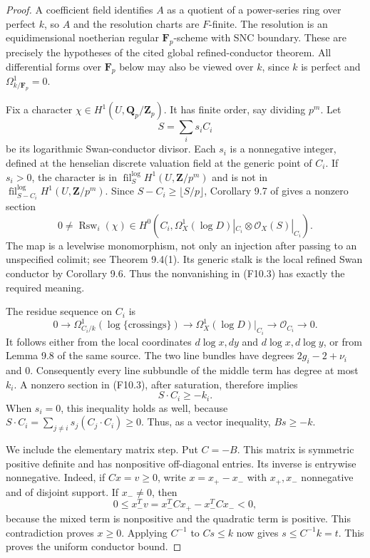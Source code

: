 \begin{proof}
A coefficient field identifies $A$ as a quotient of a power-series
ring over perfect $k$, so $A$ and the resolution charts are
$F$-finite. The resolution is an equidimensional noetherian regular
$\mathbf F_p$-scheme with SNC boundary. These are precisely the
hypotheses of the cited global refined-conductor theorem.
All differential forms over $\mathbf F_p$ below may also be viewed
over $k$, since $k$ is perfect and $\Omega^1_{k/\mathbf F_p}=0$.

Fix a character $\chi\in H^1(U,\mathbf Q_p/\mathbf Z_p)$.
It has finite order, say dividing $p^m$. Let
\[
                         S=\sum_i s_i C_i
\]
be its logarithmic Swan-conductor divisor. Each $s_i$ is a
nonnegative integer, defined at the henselian discrete valuation
field at the generic point of $C_i$. If $s_i>0$, the character is
in $\operatorname{fil}^{\log}_S H^1(U,\mathbf Z/p^m)$ and is not
in $\operatorname{fil}^{\log}_{S-C_i}H^1(U,\mathbf Z/p^m)$.
Since $S-C_i\geq\lfloor S/p\rfloor$, Corollary 9.7 of
\cite{KrishnaMajumder2026} gives a nonzero section
\[
 0\ne\operatorname{Rsw}_i(\chi)\in
 H^0\!\left(C_i,
   \Omega_X^1(\log D)|_{C_i}\otimes\mathcal O_X(S)|_{C_i}\right).
 \tag{F10.3}
\]
The map is a levelwise monomorphism, not only an injection after
passing to an unspecified colimit; see Theorem 9.4(1).
Its generic stalk is the local refined Swan conductor by
Corollary 9.6. Thus the nonvanishing in (F10.3) has exactly the
required meaning.

The residue sequence on $C_i$ is
\[
 0\longrightarrow\Omega^1_{C_i/k}(\log\{\text{crossings}\})
 \longrightarrow\Omega_X^1(\log D)|_{C_i}
 \longrightarrow\mathcal O_{C_i}\longrightarrow0.
 \tag{F10.4}
\]
It follows either from the local coordinates $d\log x,dy$ and
$d\log x,d\log y$, or from Lemma 9.8 of the same source.
The two line bundles have degrees $2g_i-2+\nu_i$ and $0$.
Consequently every line subbundle of the middle term has degree
at most $k_i$. A nonzero section in (F10.3), after saturation,
therefore implies
\[
                              S\cdot C_i\geq-k_i.
 \tag{F10.5}
\]
When $s_i=0$, this inequality holds as well, because
$S\cdot C_i=\sum_{j\ne i}s_j(C_j\cdot C_i)\geq0$.
Thus, as a vector inequality, $Bs\geq-k$.

We include the elementary matrix step. Put $C=-B$. This matrix
is symmetric positive definite and has nonpositive off-diagonal
entries. Its inverse is entrywise nonnegative. Indeed, if
$Cx=v\geq0$, write $x=x_+-x_-$ with $x_+,x_-$ nonnegative and
of disjoint support. If $x_-\ne0$, then
\[
 0\leq x_-^Tv=x_-^TCx_+-x_-^TCx_-<0,
\]
because the mixed term is nonpositive and the quadratic term is
positive. This contradiction proves $x\geq0$.
Applying $C^{-1}$ to $Cs\leq k$ now gives $s\leq C^{-1}k=t$.
This proves the uniform conductor bound.


\end{proof}
